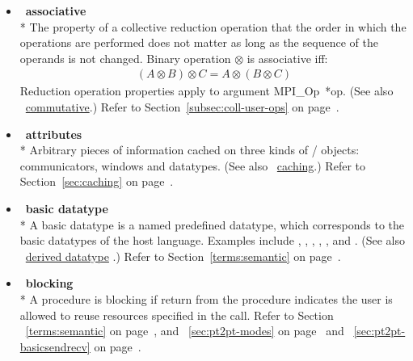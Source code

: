 \begin{itemize}
\label{glossary:associative}
\item  ~\hypertarget{glossary:associative}{\textbf{associative}} \\*
The property of a collective reduction operation that the order in which the operations are 
performed does not matter as long as the sequence of the operands is not changed. 
Binary operation $ \otimes $ is associative iff:
\begin{eqnarray}
( A \otimes B )  \otimes C = A   \otimes ( B   \otimes C ) 
\end{eqnarray}
Reduction operation properties apply to  argument MPI\_Op~*op.
(See also ~\hyperlink{glossary:commutative}{commutative}.)
Refer to Section~\ref{subsec:coll-user-ops} on page~\pageref{subsec:coll-user-ops}.

\label{glossary:attributes}
\item  ~\hypertarget{glossary:attributes}{\textbf{attributes}} \\*
Arbitrary pieces of information cached on three kinds of \MPI/ objects:
communicators, windows and datatypes.
(See also ~\hyperlink{glossary:caching}{caching}.)
Refer to Section~\ref{sec:caching} on page~\pageref{sec:caching}.

\label{glossary:basic_datatype}
\item  ~\hypertarget{glossary:basic_datatype}{\textbf{basic datatype}} \\*
A basic datatype is a named predefined datatype, which corresponds to
the basic datatypes of the host language. Examples include
,
,
,
,
, and
.
(See also ~\hyperlink{glossary:derived_datatype}{derived datatype} .)
Refer to Section~\ref{terms:semantic} on page~\pageref{terms:semantic}.

\label{glossary:blocking}
\item  ~\hypertarget{glossary:blocking}{\textbf{blocking}} \\*
A procedure is blocking if return from the procedure indicates the user
is allowed to reuse resources specified in the call.
Refer to Section ~\ref{terms:semantic} on page~\pageref{terms:semantic},
and ~\ref{sec:pt2pt-modes} on page~\pageref{sec:pt2pt-modes}
and ~\ref{sec:pt2pt-basicsendrecv} on page~\pageref{sec:pt2pt-basicsendrecv}.


\end{itemize}
